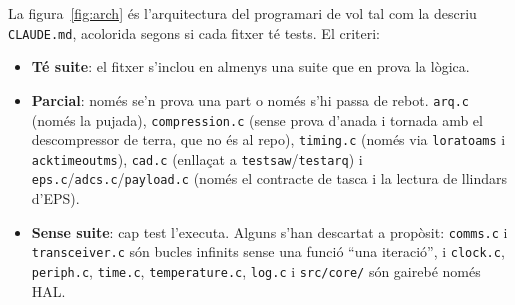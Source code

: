 \documentclass[11pt,a4paper]{article}
\DeclareRobustCommand{\_}{\textunderscore\allowbreak}
\newcommand{\cd}[1]{\texttt{#1}}
\begin{document}
La figura~\ref{fig:arch} és l'arquitectura del programari de vol tal com la descriu
\cd{CLAUDE.md}, acolorida segons si cada fitxer té tests. El criteri:
\begin{itemize}
\item \textbf{Té suite}: el fitxer s'inclou en almenys una suite que en prova la lògica.
\item \textbf{Parcial}: només se'n prova una part o només s'hi passa de rebot.
  \cd{arq.c} (només la pujada), \cd{compression.c} (sense prova d'anada i tornada amb el
  descompressor de terra, que no és al repo), \cd{timing.c} (només via \cd{lora\_toa\_ms} i
  \cd{ack\_timeout\_ms}), \cd{cad.c} (enllaçat a \cd{test\_saw}/\cd{test\_arq}) i
  \cd{eps.c}/\cd{adcs.c}/\cd{payload.c} (només el contracte de tasca i la lectura de llindars d'EPS).
\item \textbf{Sense suite}: cap test l'executa. Alguns s'han descartat a propòsit:
  \cd{comms.c} i \cd{transceiver.c} són bucles infinits sense una funció ``una iteració'', i
  \cd{clock.c}, \cd{periph.c}, \cd{time.c}, \cd{temperature.c}, \cd{log.c} i \cd{src/core/} són
  gairebé només HAL.
\end{itemize}
\end{document}
